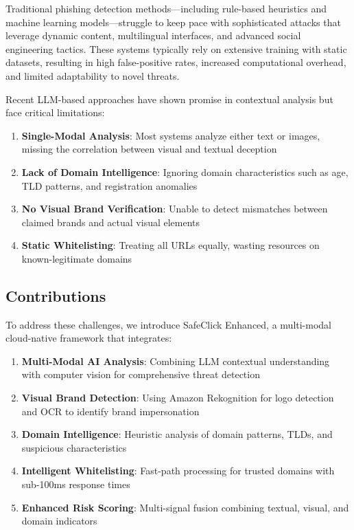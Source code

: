 \documentclass[conference]{IEEEtran}
\begin{document}
Traditional phishing detection methods—including rule-based heuristics and machine learning models—struggle to keep pace with sophisticated attacks that leverage dynamic content, multilingual interfaces, and advanced social engineering tactics. These systems typically rely on extensive training with static datasets, resulting in high false-positive rates, increased computational overhead, and limited adaptability to novel threats.

Recent LLM-based approaches have shown promise in contextual analysis but face critical limitations:

\begin{enumerate}
\item \textbf{Single-Modal Analysis}: Most systems analyze either text or images, missing the correlation between visual and textual deception
\item \textbf{Lack of Domain Intelligence}: Ignoring domain characteristics such as age, TLD patterns, and registration anomalies
\item \textbf{No Visual Brand Verification}: Unable to detect mismatches between claimed brands and actual visual elements
\item \textbf{Static Whitelisting}: Treating all URLs equally, wasting resources on known-legitimate domains
\end{enumerate}

\subsection{Contributions}

To address these challenges, we introduce SafeClick Enhanced, a multi-modal cloud-native framework that integrates:

\begin{enumerate}
\item \textbf{Multi-Modal AI Analysis}: Combining LLM contextual understanding with computer vision for comprehensive threat detection
\item \textbf{Visual Brand Detection}: Using Amazon Rekognition for logo detection and OCR to identify brand impersonation
\item \textbf{Domain Intelligence}: Heuristic analysis of domain patterns, TLDs, and suspicious characteristics
\item \textbf{Intelligent Whitelisting}: Fast-path processing for trusted domains with sub-100ms response times
\item \textbf{Enhanced Risk Scoring}: Multi-signal fusion combining textual, visual, and domain indicators
\end{enumerate}
\end{document}
